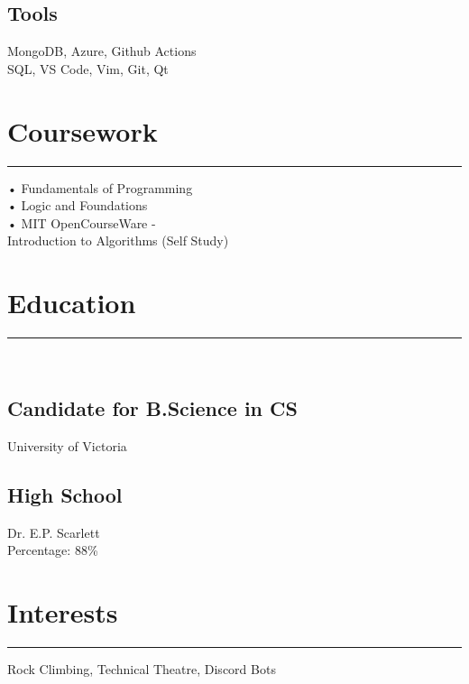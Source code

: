 \documentclass[]{resume}
\begin{document}
\begin{minipage}[t]{0.30\textwidth}
\subsection{Tools}
MongoDB, Azure, Github Actions \\ SQL, VS Code, Vim, Git, Qt
\sectionsep
\section{Coursework}
\noindent\rule{5cm}{0.4pt}

• Fundamentals of Programming\\
• Logic and Foundations\\
• MIT OpenCourseWare - \\Introduction to Algorithms (Self Study)
\sectionsep
\section{Education} 
\noindent\rule{5cm}{0.4pt}\\
\subsection{Candidate for B.Science in CS}
University of Victoria \\
\vspace{8pt}
\subsection{High School}
Dr. E.P. Scarlett\\
Percentage: 88\%
\section{Interests}
\noindent\rule{5cm}{0.4pt}

Rock Climbing, Technical Theatre, Discord Bots
\sectionsep
%
%

\end{minipage} 
\hfill
\end{document}
